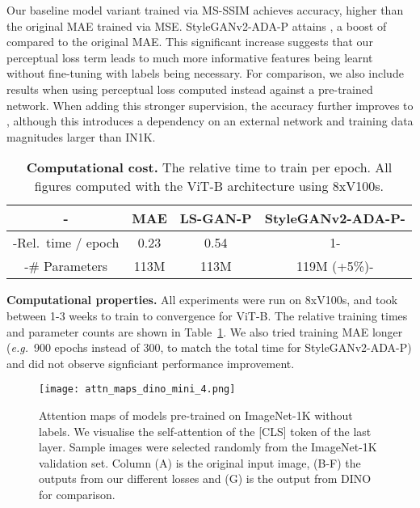 \documentclass[10pt,twocolumn,letterpaper, cta-author]{article}
\begin{document}
Our baseline model variant trained via MS-SSIM achieves  accuracy,  higher than the original MAE trained via MSE\cite{MaskedAutoencoders2021}. StyleGANv2-ADA-P attains , a boost of  compared to the original MAE. This significant increase suggests that our perceptual loss term leads to much more informative features being learnt without fine-tuning with labels being necessary. For comparison, we also include results when using perceptual loss computed instead against a pre-trained network. When adding this stronger supervision, the accuracy further improves to , although this introduces a dependency on an external network and training data magnitudes larger than IN1K.

\begin{table}
\caption{\textbf{Computational cost.} The relative time to train per epoch. All figures computed with the ViT-B architecture using 8xV100s.}
\vspace{-0.2cm}
  \centering
  \small
  \begin{tabular}{>{\kern-\tabcolsep}cccc<{\kern-\tabcolsep}}
    \toprule
     & MAE & LS-GAN-P & StyleGANv2-ADA-P\\
    \midrule
Rel.\ time / epoch & 0.23 & 0.54 & 1\\
    \# Parameters & 113M & 113M & 119M (+5\%)\\
    \bottomrule
  \end{tabular}
  \label{tab:table_traintime}
  \vspace{-0.5cm}
\end{table}



\textbf{Computational properties.} All experiments were run on 8xV100s, and took between 1-3 weeks to train to convergence for ViT-B. The relative training times and parameter counts are shown in Table~\ref{tab:table_traintime}. We also tried training MAE longer (\emph{e.g.}\ 900 epochs instead of 300, to match the total time for StyleGANv2-ADA-P) and did not observe signficiant performance improvement.

\begin{figure*}[t]
    \centering
    \texttt{[image: attn\_maps\_dino\_mini\_4.png]}
    \caption{Attention maps of models pre-trained on ImageNet-1K without labels. We visualise the self-attention of the [CLS] token of the last layer. Sample images were selected randomly from the ImageNet-1K validation set. Column (A) is the original input image, (B-F) the outputs from our different losses and (G) is the output from DINO for comparison.} 
    \label{fig:attn_maps}
\end{figure*}
\end{document}

